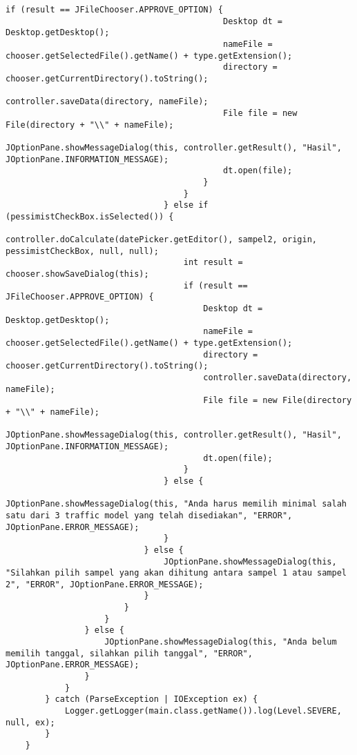 \begin{lstlisting}[caption= main.java]
                                        if (result == JFileChooser.APPROVE_OPTION) {
                                            Desktop dt = Desktop.getDesktop();
                                            nameFile = chooser.getSelectedFile().getName() + type.getExtension();
                                            directory = chooser.getCurrentDirectory().toString();
                                            controller.saveData(directory, nameFile);
                                            File file = new File(directory + "\\" + nameFile);
                                            JOptionPane.showMessageDialog(this, controller.getResult(), "Hasil", JOptionPane.INFORMATION_MESSAGE);
                                            dt.open(file);
                                        }
                                    }
                                } else if (pessimistCheckBox.isSelected()) {
                                    controller.doCalculate(datePicker.getEditor(), sampel2, origin, pessimistCheckBox, null, null);
                                    int result = chooser.showSaveDialog(this);
                                    if (result == JFileChooser.APPROVE_OPTION) {
                                        Desktop dt = Desktop.getDesktop();
                                        nameFile = chooser.getSelectedFile().getName() + type.getExtension();
                                        directory = chooser.getCurrentDirectory().toString();
                                        controller.saveData(directory, nameFile);
                                        File file = new File(directory + "\\" + nameFile);
                                        JOptionPane.showMessageDialog(this, controller.getResult(), "Hasil", JOptionPane.INFORMATION_MESSAGE);
                                        dt.open(file);
                                    }
                                } else {
                                    JOptionPane.showMessageDialog(this, "Anda harus memilih minimal salah satu dari 3 traffic model yang telah disediakan", "ERROR", JOptionPane.ERROR_MESSAGE);
                                }
                            } else {
                                JOptionPane.showMessageDialog(this, "Silahkan pilih sampel yang akan dihitung antara sampel 1 atau sampel 2", "ERROR", JOptionPane.ERROR_MESSAGE);
                            }
                        }
                    }
                } else {
                    JOptionPane.showMessageDialog(this, "Anda belum memilih tanggal, silahkan pilih tanggal", "ERROR", JOptionPane.ERROR_MESSAGE);
                }
            }
        } catch (ParseException | IOException ex) {
            Logger.getLogger(main.class.getName()).log(Level.SEVERE, null, ex);
        }
    }                                          


\end{lstlisting}
